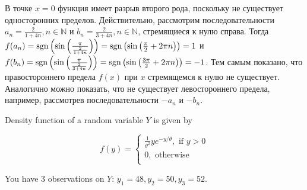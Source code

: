 \documentclass[addpoints, answers]{exam} %
\DeclareMathOperator{\sgn}{\rm sgn}
\begin{document}
\begin{questions}
\begin{solution}
В точке $x=0$ функция имеет разрыв второго рода, поскольку не существует односторонних пределов. Действительно, рассмотрим последовательности $a_n = \frac{2}{1+4 n}, n
\in \mathbb{N}$ и $b_n = \frac{2}{3+4 n}, n \in \mathbb{N}$, стремящиеся к нулю справа. Тогда $f(a_n) = {\sgn} \left(\sin \left( \frac{\pi}{\frac{2}{1+4 n}}\right)\right) = {\sgn} \left( \sin \left( \frac{\pi}{2} + 2 \pi n \right)\right)=1$ и $f(b_n) = {\sgn} \left(\sin \left( \frac{\pi}{\frac{2}{3+4 n}}\right)\right) = {\sgn} \left( \sin \left( \frac{3 \pi}{2} + 2 \pi n \right)\right)=-1$. Тем самым показано, что правостороннего предела $f(x)$ при $x$ стремящемся к нулю не существует. Аналогично можно показать, что не существует левостороннего предела, например, рассмотрев последовательности $-a_n$ и $-b_n$.
\end{solution}

\question Density function of a random variable $Y$ is given by

\[
f(y)=
\begin{cases}
    \frac{1}{\theta^2} y e^{-y/ \theta}, \text{ if } y>0 \\
    0, \text{ otherwise } \\
\end{cases}
\]

You have 3 observations on $Y$: $y_1 = 48, y_2 = 50, y_3 = 52$.

\end{questions}
\end{document}
